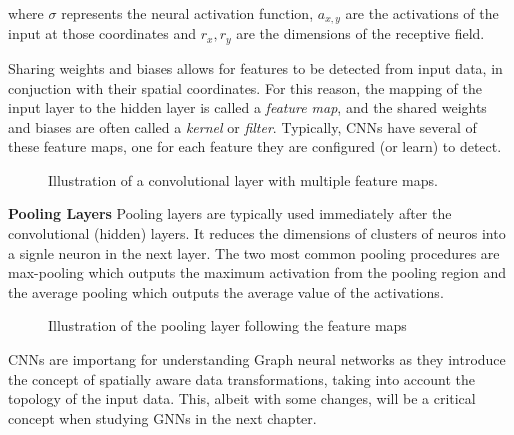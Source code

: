 where $\sigma$ represents the neural activation function, $a_{x,y}$
are the activations of the input at those coordinates and $r_x, r_y$
are the dimensions of the receptive field.

Sharing weights and biases allows for features to be detected
from input data, in conjuction with their spatial coordinates.
For this reason, the mapping of the input layer to the hidden
layer is called a \textit{feature map}, and the shared weights
and biases are often called a \textit{kernel} or \textit{filter}.
Typically, CNNs have several of these feature maps, one for each
feature they are configured (or learn) to detect.

\begin{figure}[H]
  \centering
  
  \caption{Illustration of a convolutional layer with multiple feature maps.}
  \label{fig:feature_maps}
\end{figure}

\textbf{Pooling Layers} Pooling layers are typically
used immediately after the convolutional (hidden) layers.  It reduces
the dimensions of clusters of neuros into a signle neuron in the next
layer. The two most common pooling procedures are max-pooling which
outputs the maximum activation from the pooling region and the average
pooling which outputs the average value of the activations.

\begin{figure}[H]
  \centering
  
  \caption{Illustration of the pooling layer following the feature maps}
  \label{fig:pooling}
\end{figure}

CNNs are importang for understanding Graph neural networks as they
introduce the concept of spatially aware data transformations, taking
into account the topology of the input data. This, albeit with some
changes, will be a critical concept when studying GNNs in the next chapter.